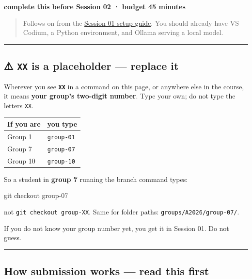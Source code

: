 \documentclass[
  letterpaper,
  10pt,
  twoside,
  openright,
  numbers=noenddot,
  chapterprefix=true]{scrbook}
\newenvironment{Shaded}{}{}
\newcommand{\FunctionTok}[1]{\textcolor[rgb]{0.44,0.26,0.76}{#1}}
\newcommand{\NormalTok}[1]{\textcolor[rgb]{0.14,0.16,0.18}{#1}}
\begin{document}
\textbf{complete this before Session 02 · budget 45 minutes}

\begin{quote}
Follows on from the \hyperref[introduction]{Session 01 setup guide}. You
should already have VS Codium, a Python environment, and Ollama serving
a local model.
\end{quote}

\begin{center}\rule{0.5\linewidth}{0.5pt}\end{center}

\subsection{\texorpdfstring{⚠️ \texttt{XX} is a placeholder --- replace
it}{⚠️ XX is a placeholder --- replace it}}\label{xx-is-a-placeholder-replace-it}

Wherever you see \textbf{\texttt{XX}} in a command on this page, or
anywhere else in the course, it means \textbf{your group's two-digit
number}. Type your own; do not type the letters \texttt{XX}.

\begin{longtable}[]{@{}ll@{}}
\toprule\noalign{}
If you are & you type \\
\midrule\noalign{}
\endhead
\bottomrule\noalign{}
\endlastfoot
Group 1 & \texttt{group-01} \\
Group 7 & \texttt{group-07} \\
Group 10 & \texttt{group-10} \\
\end{longtable}

So a student in \textbf{group 7} running the branch command types:

\begin{Shaded}
\begin{Highlighting}[]
\FunctionTok{git}\NormalTok{ checkout group{-}07}
\end{Highlighting}
\end{Shaded}

not \texttt{git\ checkout\ group-XX}. Same for folder paths:
\texttt{groups/A2026/group-07/}.

If you do not know your group number yet, you get it in Session 01. Do
not guess.

\begin{center}\rule{0.5\linewidth}{0.5pt}\end{center}

\subsection{How submission works --- read this
first}\label{how-submission-works-read-this-first}
\end{document}
